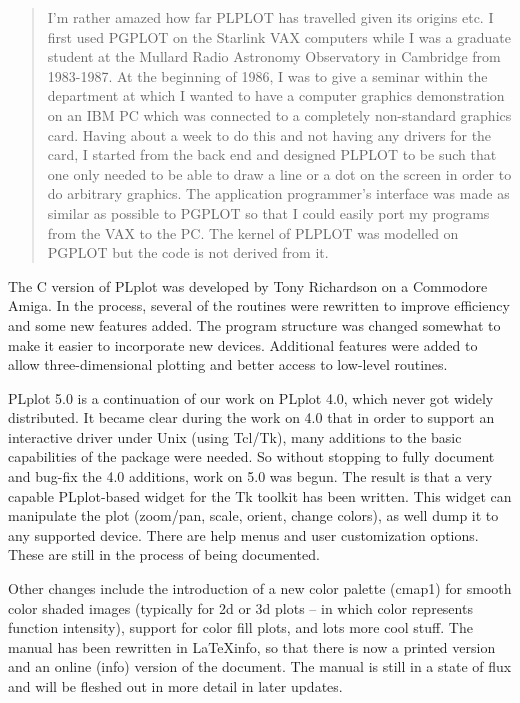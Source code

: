 \begin{quotation}
I'm rather amazed how far PLPLOT has travelled given its origins etc. I
first used PGPLOT on the Starlink VAX computers while I was a graduate
student at the Mullard Radio Astronomy Observatory in Cambridge from
1983-1987. At the beginning of 1986, I was to give a seminar within the
department at which I wanted to have a computer graphics demonstration
on an IBM PC which was connected to a completely non-standard graphics
card. Having about a week to do this and not having any drivers for the
card, I started from the back end and designed PLPLOT to be such that
one only needed to be able to draw a line or a dot on the screen in
order to do arbitrary graphics.  The application programmer's interface
was made as similar as possible to PGPLOT so that I could easily port my
programs from the VAX to the PC.  The kernel of PLPLOT was modelled on
PGPLOT but the code is not derived from it.
\end{quotation}

The C version of PLplot was developed by Tony Richardson on a
Commodore Amiga.  In the process, several of the routines were
rewritten to improve efficiency and some new features added.  The
program structure was changed somewhat to make it easier to
incorporate new devices.  Additional features were added to allow
three-dimensional plotting and better access to low-level routines.

PLplot 5.0 is a continuation of our work on PLplot 4.0, which never got
widely distributed.  It became clear during the work on 4.0 that in
order to support an interactive driver under Unix (using Tcl/Tk), many
additions to the basic capabilities of the package were needed.  So
without stopping to fully document and bug-fix the 4.0 additions, work
on 5.0 was begun.  The result is that a very capable PLplot-based widget
for the Tk toolkit has been written.  This widget can manipulate the
plot (zoom/pan, scale, orient, change colors), as well dump it to any
supported device.  There are help menus and user customization options.
These are still in the process of being documented.

Other changes include the introduction of a new color palette (cmap1)
for smooth color shaded images (typically for 2d or 3d plots -- in which
color represents function intensity), support for color fill plots, and
lots more cool stuff.  The manual has been rewritten in LaTeXinfo, so
that there is now a printed version and an online (info) version of the
document.  The manual is still in a state of flux and will be fleshed
out in more detail in later updates. 

